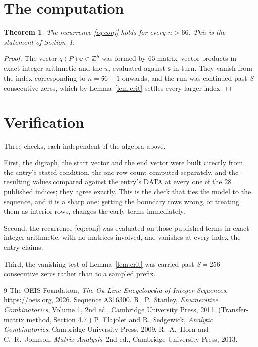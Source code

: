 \documentclass[11pt,a4paper]{article}
\theoremstyle{plain}
\newtheorem{theorem}{Theorem}
\theoremstyle{definition}
\begin{document}
\section{The computation}

\begin{theorem}
The recurrence \eqref{eq:conj} holds for every $n>66$. This is the statement of
Section~1.
\end{theorem}

\begin{proof}
The vector $q(P)\mathbf{e}\in\mathbb{Z}^{S}$ was formed by $65$ matrix--vector
products in exact integer arithmetic and the $u_j$ evaluated against $\mathbf{s}$ in turn.
They vanish from the index corresponding to $n=66+1$ onwards, and the run was continued
past $S$ consecutive zeros, which by Lemma~\ref{lem:crit} settles every larger index.
\end{proof}

\section{Verification}

Three checks, each independent of the algebra above.

First, the digraph, the start vector and the end vector were built directly from the
entry's stated condition, the one-row count computed separately, and the resulting values
compared against the entry's DATA at every one of the $28$ published indices; they
agree exactly. This is the check that ties the model to the sequence, and it is a sharp one:
getting the boundary rows wrong, or treating them as interior rows, changes the early terms
immediately.

Second, the recurrence \eqref{eq:conj} was evaluated on those published terms in exact
integer arithmetic, with no matrices involved, and vanishes at every index the entry claims.

Third, the vanishing test of Lemma~\ref{lem:crit} was carried past $S=256$ consecutive
zeros rather than to a sampled prefix.

\begin{thebibliography}{9}
 The OEIS Foundation, \emph{The On-Line Encyclopedia of Integer
Sequences}, \url{https://oeis.org}, 2026. Sequence A316300.
 R.~P.~Stanley, \emph{Enumerative Combinatorics}, Volume 1, 2nd ed.,
Cambridge University Press, 2011. (Transfer-matrix method, Section 4.7.)
 P.~Flajolet and R.~Sedgewick, \emph{Analytic Combinatorics}, Cambridge
University Press, 2009.
 R.~A.~Horn and C.~R.~Johnson, \emph{Matrix Analysis}, 2nd ed., Cambridge
University Press, 2013.
\end{thebibliography}
\end{document}
